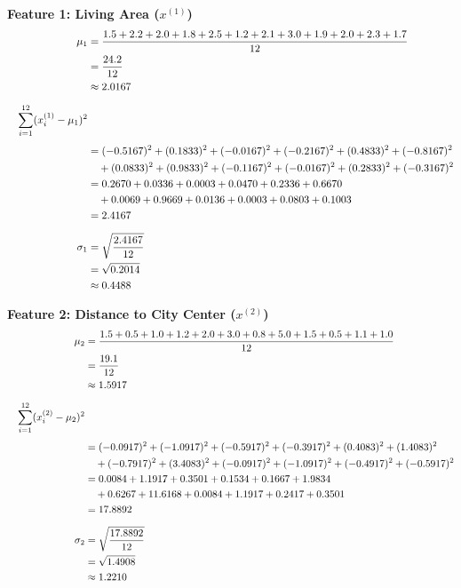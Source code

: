 \documentclass[12pt]{article}
\begin{document}
\noindent\textbf{Feature 1: Living Area ($x^{(1)}$)}
\begin{align*}
    \mu_1 &= \frac{1.5 + 2.2 + 2.0 + 1.8 + 2.5 + 1.2 + 2.1 + 3.0 + 1.9 + 2.0 + 2.3 + 1.7}{12} \\
          &= \frac{24.2}{12} \\
          &\approx 2.0167 \\[6pt]
    \hspace*{1em}\sum_{i=1}^{12} (x_i^{(1)} - \mu_1)^2 & \\[4pt]
                &= (-0.5167)^2 + (0.1833)^2 + (-0.0167)^2 + (-0.2167)^2 + (0.4833)^2 + (-0.8167)^2 \\
                &\quad + (0.0833)^2 + (0.9833)^2 + (-0.1167)^2 + (-0.0167)^2 + (0.2833)^2 + (-0.3167)^2 \\
                &= 0.2670 + 0.0336 + 0.0003 + 0.0470 + 0.2336 + 0.6670 \\
                &\quad + 0.0069 + 0.9669 + 0.0136 + 0.0003 + 0.0803 + 0.1003 \\
                &= 2.4167 \\[6pt]
    \sigma_1 &= \sqrt{\frac{2.4167}{12}} \\
             &= \sqrt{0.2014} \\
             &\approx 0.4488
\end{align*}

\noindent\textbf{Feature 2: Distance to City Center ($x^{(2)}$)}
\begin{align*}
    \mu_2 &= \frac{1.5 + 0.5 + 1.0 + 1.2 + 2.0 + 3.0 + 0.8 + 5.0 + 1.5 + 0.5 + 1.1 + 1.0}{12} \\
          &= \frac{19.1}{12} \\
          &\approx 1.5917 \\[6pt]
    \hspace*{1em}\sum_{i=1}^{12} (x_i^{(2)} - \mu_2)^2 &\\[4pt]
          &= (-0.0917)^2 + (-1.0917)^2 + (-0.5917)^2 + (-0.3917)^2 + (0.4083)^2 + (1.4083)^2 \\
          &\quad + (-0.7917)^2 + (3.4083)^2 + (-0.0917)^2 + (-1.0917)^2 + (-0.4917)^2 + (-0.5917)^2 \\
          &= 0.0084 + 1.1917 + 0.3501 + 0.1534 + 0.1667 + 1.9834 \\
          &\quad + 0.6267 + 11.6168 + 0.0084 + 1.1917 + 0.2417 + 0.3501 \\
          &= 17.8892 \\[6pt]
    \sigma_2 &= \sqrt{\frac{17.8892}{12}} \\
             &= \sqrt{1.4908} \\
             &\approx 1.2210
\end{align*}
\end{document}
